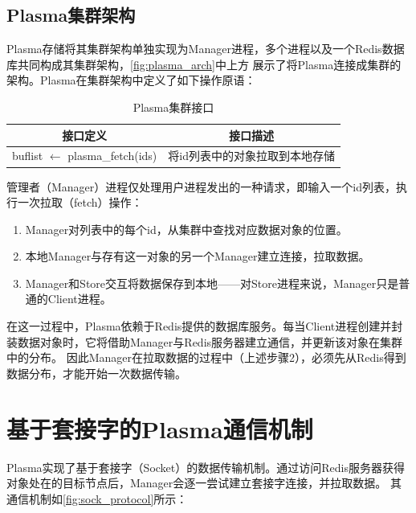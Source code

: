 \subsection{Plasma集群架构}

Plasma存储将其集群架构单独实现为Manager进程，多个进程以及一个Redis数据库共同构成其集群架构，\autoref{fig:plasma_arch}中上方
展示了将Plasma连接成集群的架构。Plasma在集群架构中定义了如下操作原语：

\begin{table}[h]
    \centering
    \caption{Plasma集群接口}
    \begin{tabular}{*{2}{c}}
        \toprule
        接口定义 & 接口描述      \\
        \midrule
        buflist $\leftarrow$ plasma\_fetch(ids)               & 将id列表中的对象拉取到本地存储   \\
        \bottomrule
    \end{tabular}
    \label{tab:manager_api}
\end{table}

管理者（Manager）进程仅处理用户进程发出的一种请求，即输入一个id列表，执行一次拉取（fetch）操作：

\begin{enumerate}
    \item Manager对列表中的每个id，从集群中查找对应数据对象的位置。 
    \item 本地Manager与存有这一对象的另一个Manager建立连接，拉取数据。
    \item Manager和Store交互将数据保存到本地——对Store进程来说，Manager只是普通的Client进程。
\end{enumerate}

在这一过程中，Plasma依赖于Redis提供的数据库服务。每当Client进程创建并封装数据对象时，它将借助Manager与Redis服务器建立通信，并更新该对象在集群中的分布。
因此Manager在拉取数据的过程中（上述步骤2），必须先从Redis得到数据分布，才能开始一次数据传输。

\section{基于套接字的Plasma通信机制}

Plasma实现了基于套接字（Socket）的数据传输机制。通过访问Redis服务器获得对象处在的目标节点后，Manager会逐一尝试建立套接字连接，并拉取数据。
其通信机制如\autoref{fig:sock_protocol}所示：

